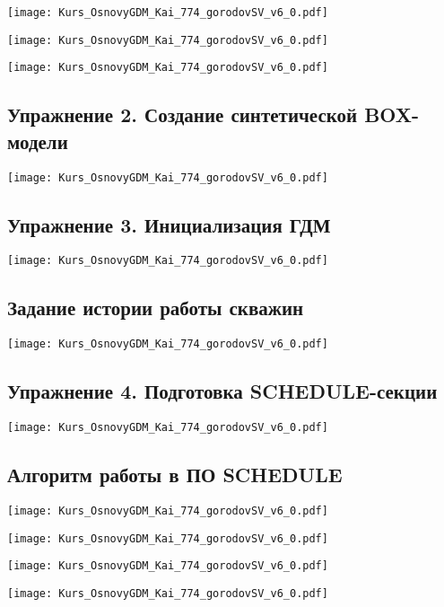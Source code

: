 \documentclass[main.tex]{subfiles}
\begin{document}
\texttt{[image: Kurs\_OsnovyGDM\_Kai\_774\_gorodovSV\_v6\_0.pdf]}

\texttt{[image: Kurs\_OsnovyGDM\_Kai\_774\_gorodovSV\_v6\_0.pdf]}

\texttt{[image: Kurs\_OsnovyGDM\_Kai\_774\_gorodovSV\_v6\_0.pdf]}

\subsection{Упражнение 2. Создание синтетической BOX-модели}

\texttt{[image: Kurs\_OsnovyGDM\_Kai\_774\_gorodovSV\_v6\_0.pdf]}

\subsection{Упражнение 3. Инициализация ГДМ}

\texttt{[image: Kurs\_OsnovyGDM\_Kai\_774\_gorodovSV\_v6\_0.pdf]}

\subsection{Задание истории работы скважин}

\texttt{[image: Kurs\_OsnovyGDM\_Kai\_774\_gorodovSV\_v6\_0.pdf]}

\subsection{Упражнение 4. Подготовка SCHEDULE-секции}

\texttt{[image: Kurs\_OsnovyGDM\_Kai\_774\_gorodovSV\_v6\_0.pdf]}

\subsection{Алгоритм работы в ПО SCHEDULE}

\texttt{[image: Kurs\_OsnovyGDM\_Kai\_774\_gorodovSV\_v6\_0.pdf]}

\texttt{[image: Kurs\_OsnovyGDM\_Kai\_774\_gorodovSV\_v6\_0.pdf]}

\texttt{[image: Kurs\_OsnovyGDM\_Kai\_774\_gorodovSV\_v6\_0.pdf]}

\texttt{[image: Kurs\_OsnovyGDM\_Kai\_774\_gorodovSV\_v6\_0.pdf]}
\end{document}
